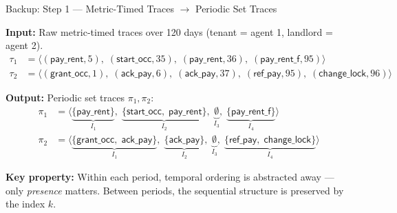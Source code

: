 \documentclass[9pt,aspectratio=169]{beamer}
\begin{document}
\begin{frame}{Backup: Step 1 — Metric-Timed Traces $\to$ Periodic Set Traces}
\small

\textbf{Input:} Raw metric-timed traces over 120 days (tenant = agent 1, landlord = agent 2).
\begingroup\footnotesize
\[
\begin{aligned}
\tau_1 &= \langle(\textsf{pay\_rent},5),\;(\textsf{start\_occ},35),\;(\textsf{pay\_rent},36),\;(\textsf{pay\_rent\_f},95)\rangle\\
\tau_2 &= \langle(\textsf{grant\_occ},1),\;(\textsf{ack\_pay},6),\;(\textsf{ack\_pay},37),\;(\textsf{ref\_pay},95),\;(\textsf{change\_lock},96)\rangle
\end{aligned}
\]
\endgroup

\begin{center}
\end{center}

\textbf{Output:} Periodic set traces $\pi_1, \pi_2$:
\begingroup\footnotesize
\[
\begin{aligned}
\pi_1 &= \langle
  \underbrace{\{\textsf{pay\_rent}\}}_{I_1},\;
  \underbrace{\{\textsf{start\_occ},\;\textsf{pay\_rent}\}}_{I_2},\;
  \underbrace{\emptyset}_{I_3},\;
  \underbrace{\{\textsf{pay\_rent\_f}\}}_{I_4}
\rangle\\[3pt]
\pi_2 &= \langle
  \underbrace{\{\textsf{grant\_occ},\;\textsf{ack\_pay}\}}_{I_1},\;
  \underbrace{\{\textsf{ack\_pay}\}}_{I_2},\;
  \underbrace{\emptyset}_{I_3},\;
  \underbrace{\{\textsf{ref\_pay},\;\textsf{change\_lock}\}}_{I_4}
\rangle
\end{aligned}
\]
\endgroup

\vspace{1mm}
\textbf{Key property:} Within each period, temporal ordering is abstracted away --- only \emph{presence} matters.
Between periods, the sequential structure is preserved by the index $k$.
\end{frame}
\end{document}
